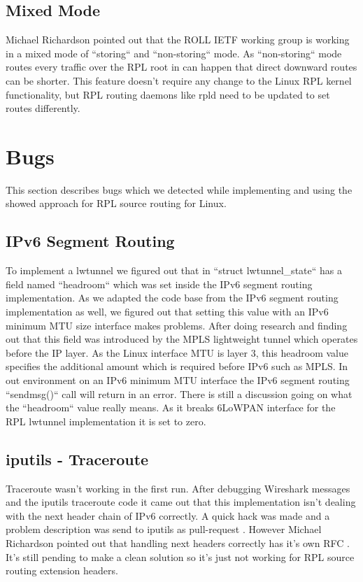 \documentclass[letterpaper]{article}
\begin{document}
\subsection{Mixed Mode}

Michael Richardson pointed out that the ROLL IETF working group is working in a mixed mode of ``storing`` and ``non-storing`` mode.
As ``non-storing`` mode routes every traffic over the RPL root in can happen that direct downward routes can be shorter.
This feature doesn't require any change to the Linux RPL kernel functionality, but RPL routing daemons like rpld need to be updated to set routes differently.

\section{Bugs}

This section describes bugs which we detected while implementing and using the showed approach for RPL source routing for Linux.

\subsection{IPv6 Segment Routing}

To implement a lwtunnel we figured out that in ``struct lwtunnel\_state`` has a field named ``headroom`` which was set inside the IPv6 segment routing implementation.
As we adapted the code base from the IPv6 segment routing implementation as well, we figured out that setting this value with an IPv6 minimum MTU size interface makes problems.
After doing research and finding out that this field was introduced by the MPLS lightweight tunnel which operates before the IP layer.
As the Linux interface MTU is layer 3, this headroom value specifies the additional amount which is required before IPv6 such as MPLS.
In out environment on an IPv6 minimum MTU interface the IPv6 segment routing ``sendmsg()`` call will return in an error.
There is still a discussion going on what the ``headroom`` value really means. As it breaks 6LoWPAN interface for the RPL lwtunnel implementation it is set to zero.

\subsection{iputils - Traceroute}

Traceroute wasn't working in the first run.
After debugging Wireshark messages and the iputils traceroute code it came out that this implementation isn't dealing with the next header chain of IPv6 correctly.
A quick hack was made and a problem description was send to iputils as pull-request \cite{iputilspr}. However Michael Richardson pointed out that handling next headers correctly has it's own RFC \cite{RFC7045}.
It's still pending to make a clean solution so it's just not working for RPL source routing extension headers.



\end{document}
